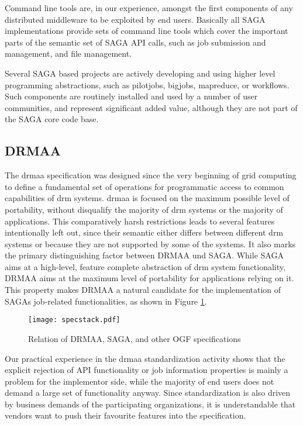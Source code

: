 \documentclass[twocolumn]{svjour3}       %
\begin{document}
Command line tools are, in our experience, amongst the first components of any distributed middleware to be exploited by end users.  Basically all SAGA implementations provide sets of command line tools which cover the important parts of the semantic set of SAGA API calls, such as job submission and management, and file management.

Several SAGA based projects are actively developing and using higher level programming abstractions, such as pilotjobs, bigjobs, mapreduce, or workflows.  Such components are routinely installed and used by a number of user communities, and represent significant added value, although they are not part of the SAGA core code base. 

\subsection{DRMAA}
\label{sec:drmaa}

The \gls{drmaa} specification was designed since the very beginning of grid computing to define a fundamental set of operations for programmatic access to common capabilities of \gls{drm} systems. \gls{drmaa} is focused on the maximum possible level of portability, without disqualify the majority of \gls{drm} systems or the majority of applications. This comparatively harsh restrictions leads to several features intentionally left out, since their semantic either differs between different \gls{drm} systems or because they are not supported by some of the systems. It also marks the primary distinguishing factor between DRMAA und SAGA. While SAGA aims at a high-level, feature complete abstraction of \gls{drm} system functionality, DRMAA aims at the maximum level of portability for applications relying on it. This property makes DRMAA a natural candidate for the implementation of SAGAs job-related functionalities, as shown in Figure \ref{fig:specstack}. 

\begin{figure}
  \texttt{[image: specstack.pdf]}
\caption{Relation of DRMAA, SAGA, and other OGF specifications}
\label{fig:specstack} 
\end{figure}


Our practical experience in the \gls{drmaa} standardization activity shows that the explicit rejection of API functionality or job information properties is mainly a problem for the implementor side, while the majority of end users does not demand a large set of functionality anyway. Since standardization is also driven by business demands of the participating organizations, it is understandable that vendors want to push their favourite features into the specification.
\end{document}
